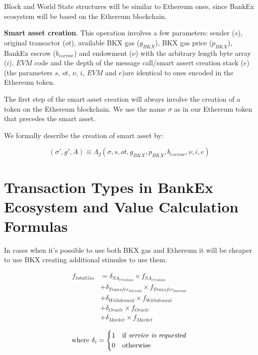 \documentclass{article}
\begin{document}
Block and World State \cite{wood2014ethereum} structures will be similar to Ethereum ones, since BankEx ecosystem will be based on the Ethereum blockchain.

\textbf{Smart asset creation}. This operation involves a few parameters: sender ($s$), original transactor ($ot$), available BKX gas ($g_{BKX}$), BKX gas price ($p_{BKX}$), BankEx escrow ($b_{escrow}$) and endowment ($\nu$) with the arbitrary length byte array ($i$), $EVM$ code and the depth of the message call/smart assert creation stack ($e$) (the parameters $s$, $ot$, $\nu$, $i$, $EVM$ and $e$)are identical to ones encoded in the Ethereum token.

The first step of the smart asset creation will always involve the creation of a token on the Ethereum blockchain. We use the name $\sigma$ as in our Ethereum token that precedes the smart asset.

We formally describe the creation of smart asset by:

\begin{equation}
    \left(\sigma', g', A\right) \equiv \Lambda_2\left(\sigma, s, ot, g_{BKX}, p_{BKX}, b_{escrow}, \nu, i, e\right)
\end{equation}

\section{Transaction Types in BankEx Ecosystem and Value Calculation Formulas}

In cases when it's possible to use both BKX gas and Ethereum it will be cheaper to use BKX creating additional stimules to use them.

\begin{equation}
	\begin{split}
    	f_{totalGas} & = \delta_{SA_{Creation}} \times f_{SA_{Creation}} \\
    	& + \delta_{Transfer_{Internal}} \times f_{Transfer_{Internal}} \\
    	& + \delta_{Withdrawal} \times f_{Withdrawal} \\
    	& + \delta_{Oracle} \times f_{Oracle} \\
    	& + \delta_{Market} \times f_{Market}
    \end{split}
\end{equation}

\begin{equation*}
	\text{where } \delta_i = 
	\begin{cases}
		1 & \text{if \textit{service is requested}} \\
		0 & \text{otherwise}
	\end{cases}
\end{equation*}
\end{document}
